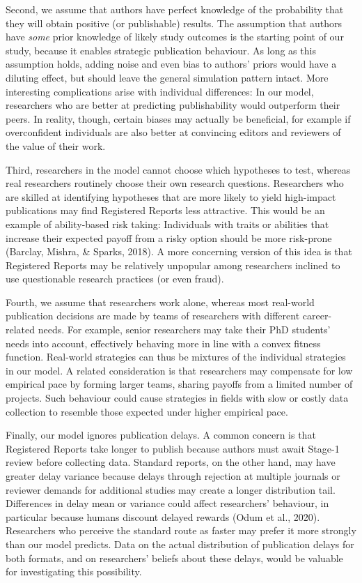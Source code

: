 \documentclass[
  british,
  a4paper,
  ,man,floatsintext]{apa6}
\begin{document}
Second, we assume that authors have perfect knowledge of the probability that they will obtain positive (or publishable) results.
The assumption that authors have \emph{some} prior knowledge of likely study outcomes is the starting point of our study, because it enables strategic publication behaviour.
As long as this assumption holds, adding noise and even bias to authors' priors would have a diluting effect, but should leave the general simulation pattern intact.
More interesting complications arise with individual differences:
In our model, researchers who are better at predicting publishability would outperform their peers.
In reality, though, certain biases may actually be beneficial, for example if overconfident individuals are also better at convincing editors and reviewers of the value of their work.

Third, researchers in the model cannot choose which hypotheses to test, whereas real researchers routinely choose their own research questions.
Researchers who are skilled at identifying hypotheses that are more likely to yield high-impact publications may find Registered Reports less attractive.
This would be an example of ability-based risk taking:
Individuals with traits or abilities that increase their expected payoff from a risky option should be more risk-prone (Barclay, Mishra, \& Sparks, 2018).
A more concerning version of this idea is that Registered Reports may be relatively unpopular among researchers inclined to use questionable research practices (or even fraud).

Fourth, we assume that researchers work alone, whereas most real-world publication decisions are made by teams of researchers with different career-related needs.
For example, senior researchers may take their PhD students' needs into account, effectively behaving more in line with a convex fitness function.
Real-world strategies can thus be mixtures of the individual strategies in our model.
A related consideration is that researchers may compensate for low empirical pace by forming larger teams, sharing payoffs from a limited number of projects.
Such behaviour could cause strategies in fields with slow or costly data collection to resemble those expected under higher empirical pace.

Finally, our model ignores publication delays.
A common concern is that Registered Reports take longer to publish because authors must await Stage-1 review before collecting data.
Standard reports, on the other hand, may have greater delay variance because delays through rejection at multiple journals or reviewer demands for additional studies may create a longer distribution tail.
Differences in delay mean or variance could affect researchers' behaviour, in particular because humans discount delayed rewards (Odum et al., 2020).
Researchers who perceive the standard route as faster may prefer it more strongly than our model predicts.
Data on the actual distribution of publication delays for both formats, and on researchers' beliefs about these delays, would be valuable for investigating this possibility.
\end{document}
